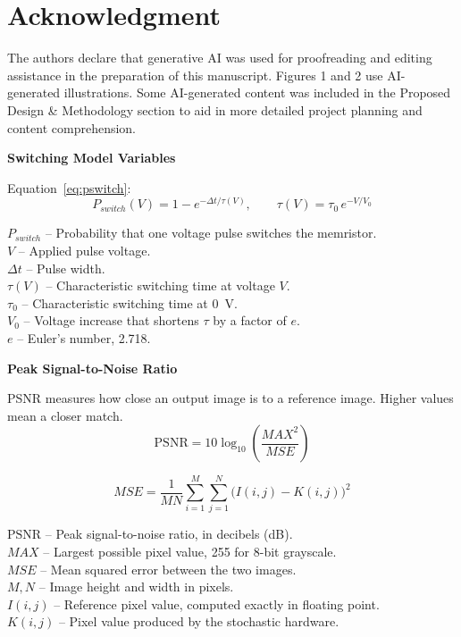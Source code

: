 \documentclass[conference]{IEEEtran}
\begin{document}
\section*{Acknowledgment}
The authors declare that generative AI was used for proofreading and editing 
assistance in the preparation of this manuscript. Figures 1 and 2 use AI-generated
illustrations. Some AI-generated content was included in the Proposed Design \& Methodology
section to aid in more detailed project planning and content comprehension.

\appendix
\textbf{Switching Model Variables}

Equation~\eqref{eq:pswitch}:
\[
  P_{switch}(V) = 1 - e^{-\Delta t/\tau(V)}, \qquad \tau(V) = \tau_0\, e^{-V/V_0}
\]
 
\noindent
$P_{switch}$ -- Probability that one voltage pulse switches the memristor.\\
$V$ -- Applied pulse voltage.\\
$\Delta t$ -- Pulse width.\\
$\tau(V)$ -- Characteristic switching time at voltage $V$.\\
$\tau_0$ -- Characteristic switching time at 0~V.\\
$V_0$ -- Voltage increase that shortens $\tau$ by a factor of $e$.\\
$e$ -- Euler's number, 2.718.

\textbf{Peak Signal-to-Noise Ratio}

PSNR measures how close an output image is to a reference image. Higher
values mean a closer match.
\[
  \mathrm{PSNR} = 10\log_{10}\!\left(\frac{MAX^2}{MSE}\right)
\]

\[
  MSE = \frac{1}{MN}\sum_{i=1}^{M}\sum_{j=1}^{N}\big(I(i,j) - K(i,j)\big)^2
\]

\noindent
$\mathrm{PSNR}$ -- Peak signal-to-noise ratio, in decibels (dB).\\
$MAX$ -- Largest possible pixel value, 255 for 8-bit grayscale.\\
$MSE$ -- Mean squared error between the two images.\\
$M, N$ -- Image height and width in pixels.\\
$I(i,j)$ -- Reference pixel value, computed exactly in floating point.\\
$K(i,j)$ -- Pixel value produced by the stochastic hardware.



\end{document}
